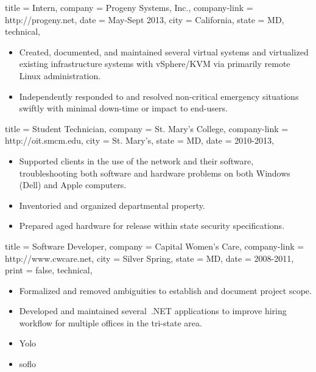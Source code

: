 \documentclass{simplecv}
\begin{document}
\begin{position}
  {
    title   = Intern,
    company = {Progeny Systems, Inc.},
    company-link = http://progeny.net,
    date    = May-Sept 2013,
    city    = California,
    state   = MD,
    technical,
  }

\begin{itemize}
\item Created, documented, and maintained several virtual systems
  and virtualized existing infrastructure systems with vSphere\slash KVM via primarily remote Linux administration.
\item Independently responded to and resolved non-critical emergency situations swiftly
  with minimal down-time or impact to end-users.
\end{itemize}
\end{position}

\begin{position}
  {
    title   = Student Technician,
    company = St. Mary's College,%
    company-link = http://oit.smcm.edu,
    city    = St. Mary's,
    state   = MD,
    date    = 2010-2013,
  }

\begin{itemize}
\item Supported clients in the use of the network and their software,
  troubleshooting both software and hardware problems on both Windows (Dell) and Apple computers.
\item Inventoried and organized departmental property.
\item Prepared aged hardware for release within state security specifications.
\end{itemize}
\end{position}

\begin{position}
  {
    title   = Software Developer,
    company = Capital Women's Care,
    company-link = http://www.cwcare.net,
    city    = Silver Spring,
    state   = MD,
    date    = 2008-2011,
    print   = false,
    technical,
  }

\begin{itemize}
\item Formalized and removed ambiguities to establish and document project scope.
\item Developed and maintained several \CSharp\,.NET applications to
  improve hiring workflow for multiple offices in the tri-state area.
  \item Yolo
  \item soflo
\end{itemize}
\end{position}
\end{document}
